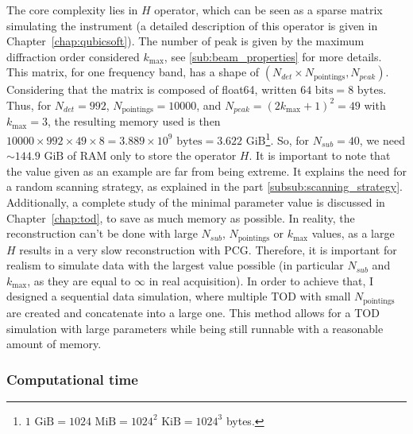 \documentclass[../../thesis.tex]{subfiles}
\begin{document}
The core complexity lies in $H$ operator, which can be seen as a sparse matrix simulating the instrument (a detailed description of this operator is given in Chapter~\ref{chap:qubicsoft}). The number of peak is given by the maximum diffraction order considered $k_\text{max}$, see \ref{sub:beam_properties} for more details. This matrix, for one frequency band, has a shape of $\left(N_{det} \times N_{\text{pointings}}, N_{peak}\right)$. Considering that the matrix is composed of float64, written $64 \text{ bits} = 8 \text{ bytes}$. Thus, for $N_{det} = 992$, $N_{\text{pointings}} = 10000$, and $N_{peak} = (2k_\text{max}+1)^2 = 49$ with $k_\text{max} = 3$, the resulting memory used is then $10000 \times 992 \times 49 \times 8 = 3.889 \times 10^9 \text{ bytes} = 3.622 \text{ GiB}$\footnote{$ 1 \text{ GiB} = 1024 \text{ MiB} = 1024^{2} \text{ KiB} = 1024^{3}$ bytes.}. So, for $N_{sub} = 40$, we need $\sim 144.9 \text{ GiB}$ of RAM only to store the operator $H$. It is important to note that the value given as an example are far from being extreme. It explains the need for a random scanning strategy, as explained in the part \ref{subsub:scanning_strategy}. Additionally, a complete study of the minimal parameter value is discussed in Chapter~\ref{chap:tod}, to save as much memory as possible. 
In reality, the reconstruction can't be done with large $N_{sub}$, $N_{\text{pointings}}$ or $k_\text{max}$ values, as a large $H$ results in a very slow reconstruction with PCG. Therefore, it is important for realism to simulate data with the largest value possible (in particular $N_{sub}$ and $k_\text{max}$, as they are equal to $\infty$ in real acquisition). In order to achieve that, I designed a sequential data simulation, where multiple TOD with small $N_{\text{pointings}}$ are created and concatenate into a large one. This method allows for a TOD simulation with large parameters while being still runnable with a reasonable amount of memory. 

\subsubsection{Computational time} \label{subsub:fmm_computation}
\end{document}
